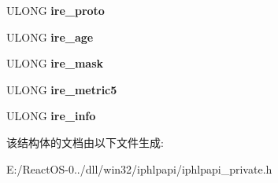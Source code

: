 \begin{DoxyCompactItemize}
U\+L\+O\+NG {\bfseries ire\+\_\+proto}
\item 
\mbox{\label{struct___i_p_route_entry_a5876135b16ed5411729eb91921ab45b4}} 
U\+L\+O\+NG {\bfseries ire\+\_\+age}
\item 
\mbox{\label{struct___i_p_route_entry_aa109faff87361399e85eeef707f59786}} 
U\+L\+O\+NG {\bfseries ire\+\_\+mask}
\item 
\mbox{\label{struct___i_p_route_entry_ad8f9b9ee132b4e62d471a998c3f60b1f}} 
U\+L\+O\+NG {\bfseries ire\+\_\+metric5}
\item 
\mbox{\label{struct___i_p_route_entry_a58ea6259ebb8a27f81faf2c44cd24a0d}} 
U\+L\+O\+NG {\bfseries ire\+\_\+info}
\end{DoxyCompactItemize}


该结构体的文档由以下文件生成\+:\begin{DoxyCompactItemize}
\item 
E\+:/\+React\+O\+S-\/0../dll/win32/iphlpapi/iphlpapi\+\_\+private.\+h\end{DoxyCompactItemize}
